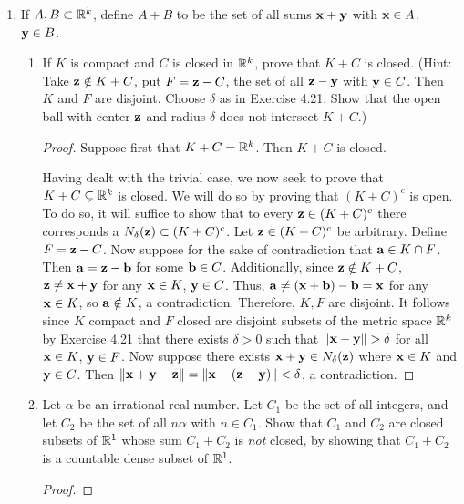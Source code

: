 \documentclass[../psets.tex]{subfiles}
\begin{document}
\begin{enumerate}[label={\textbf{\arabic*.}}]
\begin{proof}
        \begin{equation*}
            g(e) = g(c+\delta)
            = g\left( \frac{c+(c+2\delta)}{2} \right)
            \leq \frac{g(c)+g(c+2\delta)}{2}
            = \frac{g(c+2\delta)}{2}
            < g(c+2\delta)
            \leq g(e)
        \end{equation*}
        a contradiction. The proof is symmetric in the other case.
    \end{proof}
    \item If $A,B\subset\mathbb{R}^k$, define $A+B$ to be the set of all sums $\mathbf{x}+\mathbf{y}$ with $\mathbf{x}\in A$, $\mathbf{y}\in B$.
    \begin{enumerate}
        \item If $K$ is compact and $C$ is closed in $\mathbb{R}^k$, prove that $K+C$ is closed. (Hint: Take $\mathbf{z}\notin K+C$, put $F=\mathbf{z}-C$, the set of all $\mathbf{z}-\mathbf{y}$ with $\mathbf{y}\in C$. Then $K$ and $F$ are disjoint. Choose $\delta$ as in Exercise 4.21. Show that the open ball with center $\mathbf{z}$ and radius $\delta$ does not intersect $K+C$.)
        \begin{proof}
            Suppose first that $K+C=\mathbb{R}^k$. Then $K+C$ is closed.\par
            Having dealt with the trivial case, we now seek to prove that $K+C\subsetneq\mathbb{R}^k$ is closed. We will do so by proving that $(K+C)^c$ is open. To do so, it will suffice to show that to every $\mathbf{z}\in(K+C)^c$ there corresponds a $N_\delta(\mathbf{z})\subset(K+C)^c$. Let $\mathbf{z}\in(K+C)^c$ be arbitrary. Define $F=\mathbf{z}-C$. Now suppose for the sake of contradiction that $\mathbf{a}\in K\cap F$. Then $\mathbf{a}=\mathbf{z}-\mathbf{b}$ for some $\mathbf{b}\in C$. Additionally, since $\mathbf{z}\notin K+C$, $\mathbf{z}\neq\mathbf{x}+\mathbf{y}$ for any $\mathbf{x}\in K$, $\mathbf{y}\in C$. Thus, $\mathbf{a}\neq(\mathbf{x}+\mathbf{b})-\mathbf{b}=\mathbf{x}$ for any $\mathbf{x}\in K$, so $\mathbf{a}\notin K$, a contradiction. Therefore, $K,F$ are disjoint. It follows since $K$ compact and $F$ closed are disjoint subsets of the metric space $\mathbb{R}^k$ by Exercise 4.21 that there exists $\delta>0$ such that $\norm{\mathbf{x}-\mathbf{y}}>\delta$ for all $\mathbf{x}\in K$, $\mathbf{y}\in F$. Now suppose there exists $\mathbf{x}+\mathbf{y}\in N_\delta(\mathbf{z})$ where $\mathbf{x}\in K$ and $\mathbf{y}\in C$. Then $\norm{\mathbf{x}+\mathbf{y}-\mathbf{z}}=\norm{\mathbf{x}-(\mathbf{z}-\mathbf{y})}<\delta$, a contradiction.
        \end{proof}
        \item Let $\alpha$ be an irrational real number. Let $C_1$ be the set of all integers, and let $C_2$ be the set of all $n\alpha$ with $n\in C_1$. Show that $C_1$ and $C_2$ are closed subsets of $\mathbb{R}^1$ whose sum $C_1+C_2$ is \emph{not} closed, by showing that $C_1+C_2$ is a countable dense subset of $\mathbb{R}^1$.
        \begin{proof}

\end{proof}
\end{enumerate}
\end{enumerate}
\end{document}
